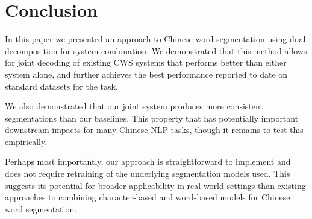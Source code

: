 \section{Conclusion}

In this paper we presented an approach to Chinese word segmentation using dual decomposition for system combination. We demonstrated that this method allows for joint decoding of existing CWS systems that performs better than either system alone, and further achieves the best performance reported to date on standard datasets for the task.

We also demonstrated that our joint system produces more consistent segmentations than our baselines. This property that has potentially important downstream impacts for many Chinese NLP tasks, though it remains to test this empirically.

Perhaps most importantly, our approach is straightforward to implement and does not require retraining of the underlying segmentation models used. This suggests its potential for broader applicability in real-world settings than existing approaches to combining character-based and word-based models for Chinese word segmentation.